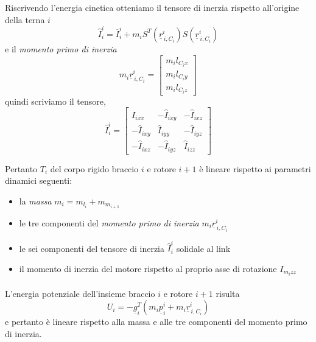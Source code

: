 Riscrivendo l'energia cinetica otteniamo il tensore di inerzia rispetto all'origine della terna $i$ 
\begin{equation}
	\hat{I}_{i}^{i} = \overline{I}_{i}^i + m_i S^T(\underline{r}_{\,i, C_i}^i)S(\underline{r}_{\,i, C_i}^i)
\end{equation}
e il \emph{momento primo di inerzia}
\begin{equation}
	m_i \underline{r}_{\,i,C_i}^i = 
	\begin{bmatrix}
		m_i l_{C_ix} \\
		m_i l_{C_iy} \\
		m_i l_{C_iz} 
	\end{bmatrix}
\end{equation}
quindi scriviamo il tensore,
\begin{equation}
	\hat{I}_{i}^{i} = 
	\begin{bmatrix}
		\hat{I}_{ixx} & -\hat{I}_{ixy} & -\hat{I}_{ixz} \\
		-\hat{I}_{ixy} & \hat{I}_{iyy} & -\hat{I}_{iyz} \\
		-\hat{I}_{ixz} & -\hat{I}_{iyz} & \hat{I}_{izz}
	\end{bmatrix}
\end{equation}

Pertanto $T_i$ del corpo rigido braccio $i$ e rotore $i+1$ è lineare rispetto ai parametri dinamici seguenti:
\begin{itemize}
	\item la \emph{massa} $m_i = m_{l_i} + m_{m_{i+1}}$
	\item le tre componenti del \emph{momento primo di inerzia} $m_i \underline{r}_{\,i,C_i}^i$
	\item le sei componenti del tensore di inerzia $\hat{I}_i^i$ solidale al link
	\item il momento di inerzia del motore rispetto al proprio asse di rotazione $I_{m_izz}$
\end{itemize} 
\paragraph{}
L'energia potenziale dell'insieme braccio $i$ e rotore $i+1$ risulta
\begin{equation}
	U_i = -\underline{g}_i^T(m_i \underline{p}_i^i + m_i \underline{r}_{\,i,C_i}^i)
\end{equation}
e pertanto è lineare rispetto alla massa e alle tre componenti del momento primo di inerzia.

